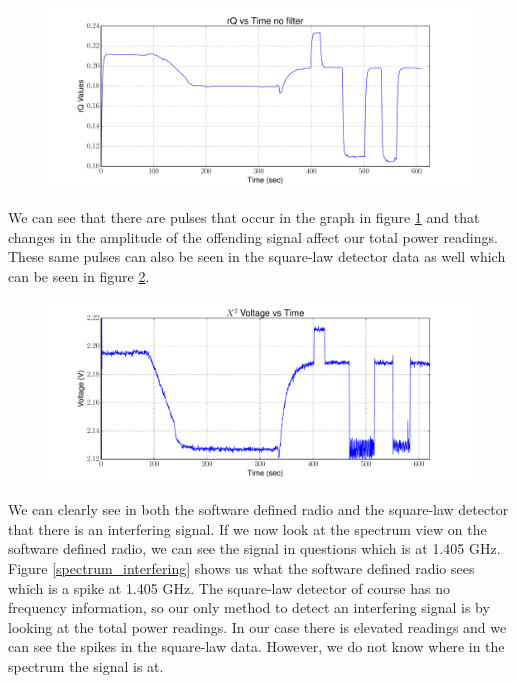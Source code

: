 \begin{figure}[h!tb] \centering

\includegraphics[width=\textwidth]{Experiments/Exp4/sdr_raw_unfiltered.pdf}

\label{sdr_unfilt_raw}
\end{figure}

We can see that there are pulses that occur in the graph in figure \ref{sdr_unfilt_raw} and that changes in the amplitude of the offending signal affect our total power readings.  These same pulses can also be seen in the square-law detector data as well which can be seen in figure \ref{x2_unfilt}.

\begin{figure}[h!tb] \centering

\includegraphics[width=\textwidth]{Experiments/Exp4/x2_voltage.pdf}

\label{x2_unfilt}
\end{figure}

We can clearly see in both the software defined radio and the square-law detector that there is an interfering signal.  If we now look at the spectrum view on the software defined radio, we can see the signal in questions which is at 1.405 GHz.  Figure \ref{spectrum_interfering} shows us what the software defined radio sees which is a spike at 1.405 GHz.  The square-law detector of course has no frequency information, so our only method to detect an interfering signal is by looking at the total power readings.  In our case there is elevated readings and we can see the spikes in the square-law data.  However, we do not know where in the spectrum the signal is at.

